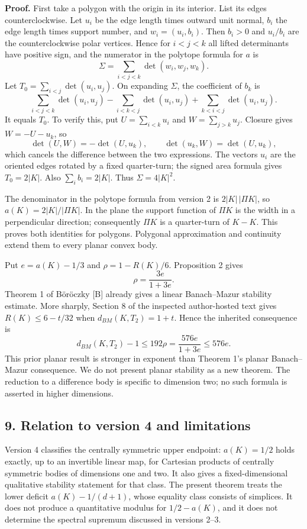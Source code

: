 \documentclass[
  11pt,
]{article}
\begin{document}
\textbf{Proof.} First take a polygon with the origin in its interior.
List its edges counterclockwise. Let \(u_i\) be the edge length times
outward unit normal, \(b_i\) the edge length times support number, and
\(w_i=(u_i,b_i)\). Then \(b_i>0\) and \(u_i/b_i\) are the
counterclockwise polar vertices. Hence for \(i<j<k\) all lifted
determinants have positive sign, and the numerator in the polytope
formula for \(a\) is \[\Sigma=\sum_{i<j<k}\det(w_i,w_j,w_k).\] Let
\(T_0=\sum_{i<j}\det(u_i,u_j)\). On expanding \(\Sigma\), the
coefficient of \(b_k\) is \[\sum_{i<j<k}\det(u_i,u_j)
-\sum_{i<k<j}\det(u_i,u_j)
+\sum_{k<i<j}\det(u_i,u_j).\] It equals \(T_0\). To verify this, put
\(U=\sum_{i<k}u_i\) and \(W=\sum_{j>k}u_j\). Closure gives \(W=-U-u_k\),
so \[\det(U,W)=-\det(U,u_k),\qquad
\det(u_k,W)=\det(U,u_k),\] which cancels the difference between the two
expressions. The vectors \(u_i\) are the oriented edges rotated by a
fixed quarter-turn; the signed area formula gives \(T_0=2|K|\). Also
\(\sum_i b_i=2|K|\). Thus \(\Sigma=4|K|^2\).

The denominator in the polytope formula from version 2 is
\(2|K|\,|\Pi K|\), so \(a(K)=2|K|/|\Pi K|\). In the plane the support
function of \(\Pi K\) is the width in a perpendicular direction;
consequently \(\Pi K\) is a quarter-turn of \(K-K\). This proves both
identities for polygons. Polygonal approximation and continuity extend
them to every planar convex body.

Put \(e=a(K)-1/3\) and \(\rho=1-R(K)/6\). Proposition 2 gives
\[\rho=\frac{3e}{1+3e}.\] Theorem 1 of Böröczky {[}B{]} already gives a
linear Banach--Mazur stability estimate. More sharply, Section 8 of the
inspected author-hosted text gives \(R(K)\le6-t/32\) when
\(d_{BM}(K,T_2)=1+t\). Hence the inherited consequence is
\[\boxed{d_{BM}(K,T_2)-1\le192\rho
=\frac{576e}{1+3e}\le576e.}\] This prior planar result is stronger in
exponent than Theorem 1's planar Banach--Mazur consequence. We do not
present planar stability as a new theorem. The reduction to a difference
body is specific to dimension two; no such formula is asserted in higher
dimensions.

\subsection{9. Relation to version 4 and
limitations}\label{relation-to-version-4-and-limitations}

Version 4 classifies the centrally symmetric upper endpoint:
\(a(K)=1/2\) holds exactly, up to an invertible linear map, for
Cartesian products of centrally symmetric bodies of dimensions one and
two. It also gives a fixed-dimensional qualitative stability statement
for that class. The present theorem treats the lower deficit
\(a(K)-1/(d+1)\), whose equality class consists of simplices. It does
not produce a quantitative modulus for \(1/2-a(K)\), and it does not
determine the spectral supremum discussed in versions 2--3.
\end{document}
